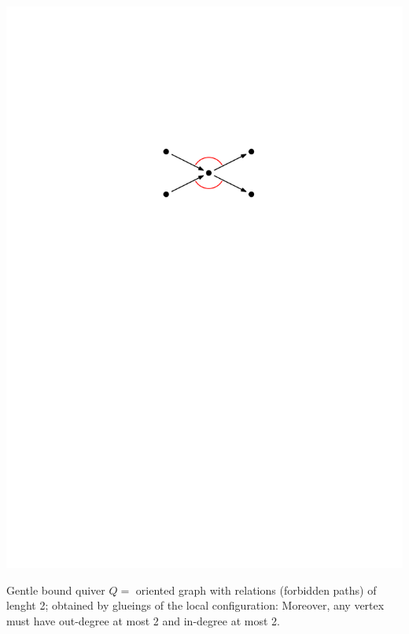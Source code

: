 \documentclass[portrait,final,a0paper,fontscale=0.25]{baposter}
\theoremstyle{definition}
\begin{document}
\begin{poster}
{\vspace*{.15cm}\hspace*{7.5cm}\includegraphics[scale=.35]{GentleCondition}

\vspace*{-1.2cm}
\begin{minipage}{7.2cm}
{\color{green} Gentle bound quiver} $Q =$ oriented graph with relations (forbidden paths) of lenght 2; obtained by glueings of the local configuration:
Moreover, any vertex must have out-degree at most 2 and in-degree at most 2.

\medskip


\end{minipage}}
\end{poster}
\end{document}
